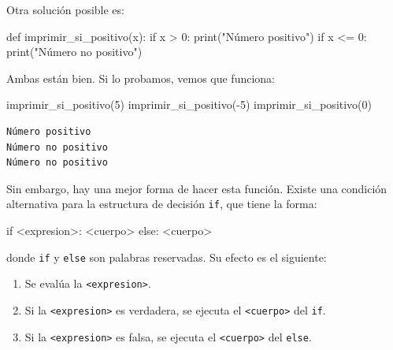 \documentclass[
  letterpaper,
  DIV=11,
  numbers=noendperiod]{scrreprt}
\newenvironment{Shaded}{\begin{snugshade}}{\end{snugshade}}
\newcommand{\BuiltInTok}[1]{\textcolor[rgb]{0.00,0.23,0.31}{#1}}
\newcommand{\ControlFlowTok}[1]{\textcolor[rgb]{0.00,0.23,0.31}{#1}}
\newcommand{\DecValTok}[1]{\textcolor[rgb]{0.68,0.00,0.00}{#1}}
\newcommand{\KeywordTok}[1]{\textcolor[rgb]{0.00,0.23,0.31}{#1}}
\newcommand{\NormalTok}[1]{\textcolor[rgb]{0.00,0.23,0.31}{#1}}
\newcommand{\OperatorTok}[1]{\textcolor[rgb]{0.37,0.37,0.37}{#1}}
\newcommand{\StringTok}[1]{\textcolor[rgb]{0.13,0.47,0.30}{#1}}
\providecommand{\tightlist}{%
  \setlength{\itemsep}{0pt}\setlength{\parskip}{0pt}}\usepackage{longtable,booktabs,array}
\begin{document}
Otra solución posible es:

\begin{Shaded}
\begin{Highlighting}[]
\KeywordTok{def}\NormalTok{ imprimir\_si\_positivo(x):}
  \ControlFlowTok{if}\NormalTok{ x }\OperatorTok{\textgreater{}} \DecValTok{0}\NormalTok{:}
      \BuiltInTok{print}\NormalTok{(}\StringTok{"Número positivo"}\NormalTok{)}
  \ControlFlowTok{if}\NormalTok{ x }\OperatorTok{\textless{}=} \DecValTok{0}\NormalTok{:}
      \BuiltInTok{print}\NormalTok{(}\StringTok{"Número no positivo"}\NormalTok{)}
\end{Highlighting}
\end{Shaded}

Ambas están bien. Si lo probamos, vemos que funciona:

\begin{Shaded}
\begin{Highlighting}[]
\NormalTok{imprimir\_si\_positivo(}\DecValTok{5}\NormalTok{)}
\NormalTok{imprimir\_si\_positivo(}\OperatorTok{{-}}\DecValTok{5}\NormalTok{)}
\NormalTok{imprimir\_si\_positivo(}\DecValTok{0}\NormalTok{)}
\end{Highlighting}
\end{Shaded}

\begin{verbatim}
Número positivo
Número no positivo
Número no positivo
\end{verbatim}

Sin embargo, hay una mejor forma de hacer esta función. Existe una
condición alternativa para la estructura de decisión \texttt{if}, que
tiene la forma:

\begin{Shaded}
\begin{Highlighting}[]
\ControlFlowTok{if} \OperatorTok{\textless{}}\NormalTok{expresion}\OperatorTok{\textgreater{}}\NormalTok{:}
    \OperatorTok{\textless{}}\NormalTok{cuerpo}\OperatorTok{\textgreater{}}
\ControlFlowTok{else}\NormalTok{:}
    \OperatorTok{\textless{}}\NormalTok{cuerpo}\OperatorTok{\textgreater{}}
\end{Highlighting}
\end{Shaded}

donde \texttt{if} y \texttt{else} son palabras reservadas. Su efecto es
el siguiente:

\begin{enumerate}
\def\labelenumi{\arabic{enumi}.}
\tightlist
\item
  Se evalúa la \texttt{\textless{}expresion\textgreater{}}.
\item
  Si la \texttt{\textless{}expresion\textgreater{}} es verdadera, se
  ejecuta el \texttt{\textless{}cuerpo\textgreater{}} del \texttt{if}.
\item
  Si la \texttt{\textless{}expresion\textgreater{}} es falsa, se ejecuta
  el \texttt{\textless{}cuerpo\textgreater{}} del \texttt{else}.
\end{enumerate}
\end{document}
